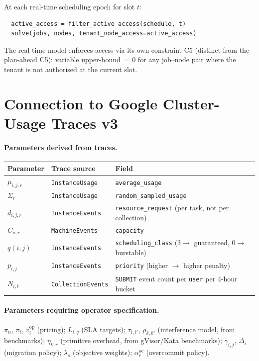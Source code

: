 \documentclass[11pt,a4paper]{article}
\begin{document}
At each real-time scheduling epoch for slot $t$:
\begin{verbatim}
  active_access = filter_active_access(schedule, t)
  solve(jobs, nodes, tenant_node_access=active_access)
\end{verbatim}

The real-time model enforces access via its own constraint C5 (distinct from
the plan-ahead C5): variable upper-bound $= 0$ for any job--node pair where
the tenant is not authorised at the current slot.

\section{Connection to Google Cluster-Usage Traces v3}

\paragraph{Parameters derived from traces.}
\begin{center}
\begin{tabular}{@{}lll@{}}
  \toprule
  Parameter & Trace source & Field \\
  \midrule
  $\mu_{i,j,r}$  & \texttt{InstanceUsage}   & \texttt{average\_usage} \\
  $\Sigma_r$     & \texttt{InstanceUsage}   & \texttt{random\_sampled\_usage} \\
  $d_{i,j,r}$   & \texttt{InstanceEvents}  & \texttt{resource\_request} (per task, not per collection) \\
  $C_{n,r}$     & \texttt{MachineEvents}   & \texttt{capacity} \\
  $q(i,j)$      & \texttt{InstanceEvents}  & \texttt{scheduling\_class} ($3\to$ guaranteed, $0\to$ burstable) \\
  $p_{i,j}$     & \texttt{InstanceEvents}  & \texttt{priority} (higher $\to$ higher penalty) \\
  $N_{i,t}$     & \texttt{CollectionEvents}& \texttt{SUBMIT} event count per \texttt{user} per 4-hour bucket \\
  \bottomrule
\end{tabular}
\end{center}

\paragraph{Parameters requiring operator specification.}
$\pi_n$, $\bar{\pi}_i$, $v_i^{\text{op}}$ (pricing);
$L_{i,q}$ (SLA targets);
$\tau_{i,i'}$, $\rho_{k,k'}$ (interference model, from benchmarks);
$\eta_{k,r}$ (primitive overhead, from gVisor/Kata benchmarks);
$\gamma_{i,j}$, $\Delta_i$ (migration policy);
$\lambda_s$ (objective weights);
$\alpha_r^{\text{oc}}$ (overcommit policy).
\end{document}
